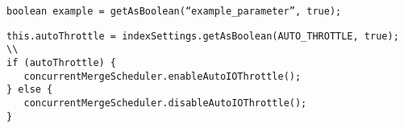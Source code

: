 \lstset{language=Java}
\begin{lstlisting}[frame=single]
boolean example = getAsBoolean(“example_parameter”, true);
\end{lstlisting}

\lstset{language=Java}
\begin{lstlisting}[frame=single]
this.autoThrottle = indexSettings.getAsBoolean(AUTO_THROTTLE, true);
\\
if (autoThrottle) {
   concurrentMergeScheduler.enableAutoIOThrottle();
} else {
   concurrentMergeScheduler.disableAutoIOThrottle();
}
\end{lstlisting}


